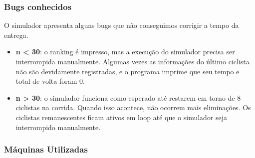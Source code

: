 \documentclass{beamer}
\begin{document}
\begin{frame}
\frametitle{Bugs conhecidos}
O simulador apresenta alguns bugs que não conseguimos corrigir a tempo da entrega. 

\begin{itemize}
\item \textbf{n < 30}: o ranking é impresso, mas a execução do simulador precisa ser interrompida manualmente. Algumas vezes as informações do último ciclista não são devidamente registradas, e o programa imprime que seu tempo e total de volta foram 0.

\item \textbf{n > 30}: o simulador funciona como esperado até restarem em torno de 8 ciclistas na corrida. Quando isso acontece, não ocorrem mais eliminações. Os ciclistas remanescentes ficam ativos em loop até que o simulador seja interrompido manualmente.

\end{itemize}

\end{frame}


\begin{frame}
\frametitle{Máquinas Utilizadas}



\end{frame}
\end{document}
